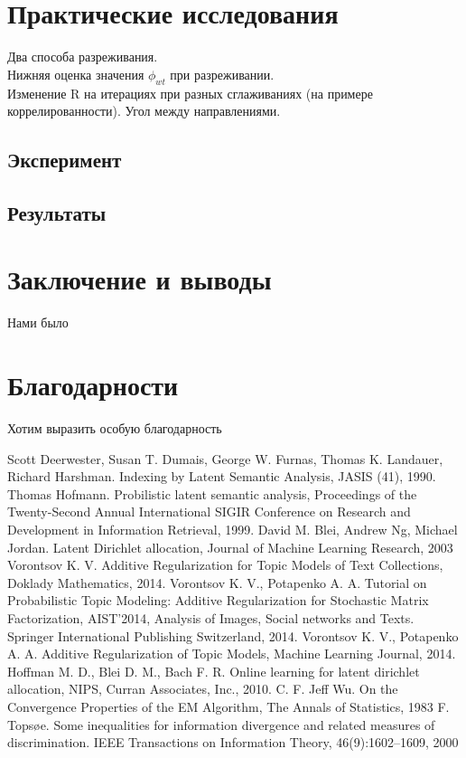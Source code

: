 \documentclass[12pt]{article}
\begin{document}
	\section{Практические исследования}
          Два способа разреживания.\\
	Нижняя оценка значения $\phi_{wt}$ при разреживании.\\
	Изменение R на итерациях при разных сглаживаниях (на примере коррелированности). Угол между направлениями. \\
	\subsection{Эксперимент}
	\subsection{Результаты}

	\section{Заключение и выводы}
	Нами было 
	\section{Благодарности}
	Хотим выразить особую благодарность 
\newpage
	\begin{thebibliography}{@@@@}
		Scott Deerwester, Susan T. Dumais, George W. Furnas, Thomas K. Landauer, Richard Harshman. Indexing by Latent Semantic Analysis,  JASIS (41), 1990.
		Thomas Hofmann. Probilistic latent semantic analysis, Proceedings of the Twenty-Second Annual International SIGIR Conference on Research and Development in Information Retrieval, 1999.
		David M. Blei, Andrew Ng, Michael Jordan. Latent Dirichlet allocation, Journal of Machine Learning Research,  2003
		Vorontsov K. V. Additive Regularization for Topic Models of Text Collections, Doklady Mathematics, 2014.
		Vorontsov K. V., Potapenko A. A. Tutorial on Probabilistic Topic Modeling: Additive Regularization for Stochastic Matrix Factorization,  AIST’2014, Analysis of Images, Social networks and Texts. Springer International Publishing Switzerland, 2014.
		Vorontsov K. V., Potapenko A. A. Additive Regularization of Topic Models, Machine Learning Journal, 2014.
		Hoffman M. D., Blei D. M., Bach F. R. Online learning for latent dirichlet allocation, NIPS, Curran Associates, Inc., 2010.
		C. F. Jeff Wu. On the Convergence Properties of the EM Algorithm, The Annals of Statistics, 1983
		F. Topsøe. Some inequalities for information divergence and related measures of discrimination. IEEE Transactions on Information Theory, 46(9):1602–1609, 2000
	\end{thebibliography}
\end{document}
